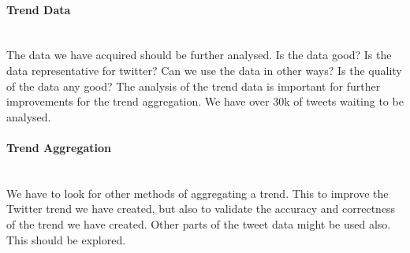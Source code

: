 \paragraph{Trend Data}
\hspace{0pt}\\
The data we have acquired should be further analysed. Is the data good? Is the
data representative for twitter? Can we use the data in other ways? Is the
quality of the data any good?  The analysis of the trend data is important for
further improvements for the trend aggregation. We have over 30k of tweets
waiting to be analysed. 

\paragraph{Trend Aggregation}
\hspace{0pt}\\
We have to look for other methods of aggregating a trend. This to improve the
Twitter trend we have created, but also to validate the accuracy and
correctness of the trend we have created. Other parts of the tweet data might
be used also. This should be explored.  
%
